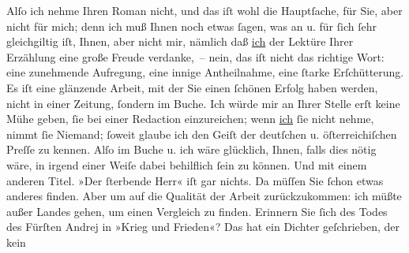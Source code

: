 \pstart
           Alſo ich nehme Ihren Roman
               nicht, und das iſt wohl die Hauptſache, für Sie, aber nicht für mich; denn ich muß
               Ihnen noch etwas{ }ſagen, was an u. für{ }ſich{ }ſehr gleichgiltig iſt, Ihnen, aber nicht
               mir, nämlich daß {\pb}\uline{ich} der Lektüre Ihrer Erzählung eine große Freude verdanke, – nein, das iſt
                   nicht das richtige Wort: eine zunehmende Aufregung, eine innige
               Antheilnahme, eine{ }ſtarke Erſchütterung. Es iſt eine glänzende Arbeit, mit der Sie
               einen{ }ſchönen Erfolg haben werden, nicht in einer Zeitung,{ }ſondern im Buche. Ich
               würde mir an Ihrer Stelle erſt keine Mühe geben,{ }ſie bei einer Redaction
               einzureichen; wenn \uline{ich}{ }ſie nicht nehme, nimmt{ }ſie Niemand;{ }ſoweit glaube
               ich den Geiſt der deutſchen u. öſterreichiſchen Preſſe zu kennen. Alſo im Buche
               u. ich wäre glücklich, Ihnen, falls dies nötig wäre, in irgend einer Weiſe dabei
               behilflich{ }ſein zu können. Und mit einem anderen Titel. »Der{ }ſterbende Herr« iſt gar nichts. Da müſſen Sie{ }ſchon etwas
               anderes finden. Aber um auf die Qualität der Arbeit zurückzukommen: ich müßte außer
               Landes gehen, um einen Vergleich zu finden. Erinnern Sie{ }ſich des Todes des Fürſten
               Andrej in »Krieg und Frieden«? Das hat ein Dichter geſchrieben, der kein
